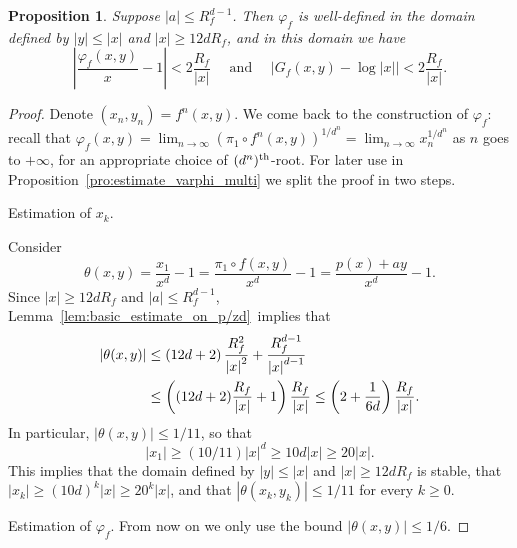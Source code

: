 \documentclass[oneside, 12pt]{amsart}
\newcommand{\abs}[1]{\left\vert#1\right\vert}
\newcommand{\lrpar}[1]{\left(#1\right)}
\theoremstyle{plain}
\newtheorem{pro}[thm]{Proposition}
\theoremstyle{definition}
\numberwithin{equation}{section}       %
\numberwithin{equation}{section}       %
\begin{document}
\begin{pro}\label{pro:estimate_varphi}
 Suppose
  $\abs{a}\leq R_f^{d-1 }$. Then $\varphi_f$ is well-defined in the domain defined by  $\abs{y}\leq \abs{x}$ and $\abs{x}\geq   
12dR_f$,  and in this domain we have  
$$\abs{\frac{\varphi_f(x,y)}{x} - 1} <  2 \frac{R_f}{\abs{x}} \quad \text{ and }  \quad \abs{G_f(x,y) - \log \abs{x}}<    2 \frac{R_f}{\abs{x}} .$$
\end{pro}


\begin{proof}
 Denote $(x_n, y_n) = f^n(x,y)$. We come back to the construction of $\varphi_f$:  recall that   
  $\varphi_f(x,y)= \lim_{n\to\infty}  (\pi_1\circ f^n(x,y))^{1/d^n} =\lim_{n\to\infty}   x_n^{1/d^n}$ as $n$ goes to $+\infty$, for an appropriate choice of $(d^n)^{\rm th}$-root. For later use in Proposition~\ref{pro:estimate_varphi_multi} we split the proof in two steps. 
 
 Estimation of $x_k$.   

Consider
 \begin{equation}\label{eq:deftheta}
\theta(x,y) = \frac{x_1}{x^d} - 1 = \frac{\pi_1\circ f(x,y)}{x^d} - 1 = \frac{p(x)+ay}{x^d} -1.
\end{equation}
Since $\abs{x}\geq 12dR_f$ and $\abs{a}\leq R_f^{d-1}$, Lemma~\ref{lem:basic_estimate_on_p/zd} implies that 
 \begin{align}\label{eq:theta}
\abs{\theta(x,y)}  &\leq \lrpar{12d+2}\frac{R_f^{2}}{\abs{x}^2} + \frac{R_f^{d-1}}{\abs{x}^{d-1}} \\
&\notag \leq 
\lrpar{(12d+2) \frac{R_f}{\abs{x}}+1}\frac{R_f}{\abs{x}} %
\notag \leq
 \lrpar{  2+\frac{1}{6d}  }\frac{R_f}{\abs{x}}.
\end{align}
In particular, $\abs{\theta(x,y)}\leq 1/11$, so that 
\begin{equation}\label{eq:10d}
\abs{x_1}\geq (10/11) \abs{x}^d\geq 10d \abs{x} \geq 20 \abs{x}.\end{equation} 
This implies that the domain defined by $\abs{y}\leq \abs{x}$ and $\abs{x}\geq 12d R_f$ is stable, 
that $\abs{x_k}\geq (10d)^k   \abs{x}\geq 20^k \abs{x}$,  and that $\abs{\theta(x_k,y_k)}\leq 1/11$ for every $k\geq 0$.


 Estimation of $\varphi_f$.  From now on we only use the bound    $\abs{\theta(x,y)}\leq 1/6$. 


\end{proof}
\end{document}
